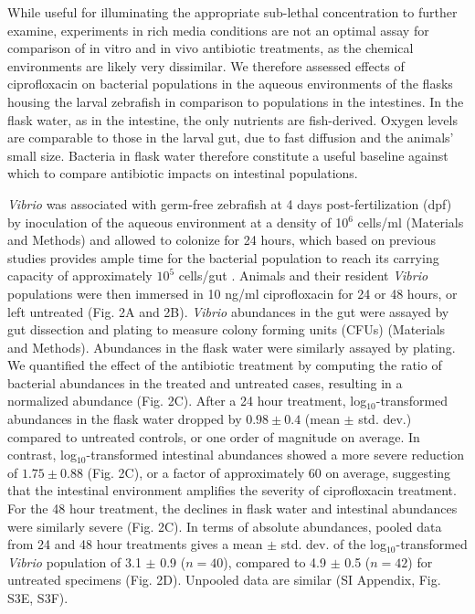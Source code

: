 While useful for illuminating the appropriate sub-lethal concentration to further examine, experiments in rich media conditions are not an optimal assay for comparison of in vitro and in vivo antibiotic treatments, as the chemical environments are likely very dissimilar. We therefore assessed effects of ciprofloxacin on bacterial populations in the aqueous environments of the flasks housing the larval zebrafish in comparison to populations in the intestines. In the flask water, as in the intestine, the only nutrients are fish-derived. Oxygen levels are  comparable to those in the larval gut, due to fast diffusion and the animals' small size. Bacteria in flask water therefore constitute a useful baseline against which to compare antibiotic impacts on intestinal populations.

\textit{Vibrio} was associated with germ-free zebrafish at 4 days post-fertilization (dpf) by inoculation of the aqueous environment at a density of 10$^6$ cells/ml (Materials and Methods) and allowed to colonize for 24 hours, which based on previous studies provides ample time for the bacterial population to reach its carrying capacity of approximately $10^5$ cells/gut \cite{wiles_host_2016}. Animals and their resident \textit{Vibrio} populations were then immersed in 10 ng/ml ciprofloxacin for 24 or 48 hours, or left untreated (Fig. 2A and 2B). \textit{Vibrio} abundances in the gut were assayed by gut dissection and plating to measure colony forming units (CFUs) (Materials and Methods). Abundances in the flask water were similarly assayed by plating. We quantified the effect of the antibiotic treatment by computing the ratio of bacterial abundances in the treated and untreated cases, resulting in a normalized abundance (Fig. 2C). After a 24 hour treatment, log$_{10}$-transformed abundances in the flask water dropped by $0.98 \pm 0.4$ (mean $\pm$ std. dev.) compared to untreated controls, or one order of magnitude on average. In contrast, log$_{10}$-transformed intestinal abundances showed a more severe reduction of $1.75 \pm 0.88$ (Fig. 2C), or a factor of approximately 60 on average, suggesting that the intestinal environment amplifies the severity of ciprofloxacin treatment. For the 48 hour treatment, the declines in flask water and intestinal abundances were similarly severe (Fig. 2C). In terms of absolute abundances, pooled data from 24 and 48 hour treatments gives a mean $\pm$ std. dev. of the log$_{10}$-transformed \textit{Vibrio} population of 3.1 $\pm$ 0.9 ($n = 40$), compared to 4.9 $\pm$ 0.5 ($n = 42$) for untreated specimens (Fig. 2D). Unpooled data are similar (SI Appendix, Fig. S3E, S3F).  


